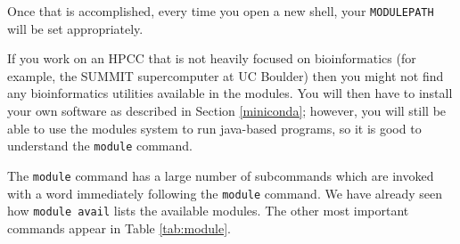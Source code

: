 \documentclass[]{krantz}
\makeatletter
\newenvironment{Shaded}{\begin{snugshade}}{\end{snugshade}}
\newcommand{\BuiltInTok}[1]{#1}
\newcommand{\NormalTok}[1]{#1}
\newcommand{\VariableTok}[1]{\textcolor[rgb]{0,0,0}{#1}}
\newenvironment{kframe}{%
\medskip{}
\setlength{\fboxsep}{.8em}
 \def\at@end@of@kframe{}%
 \ifinner\ifhmode%
  \def\at@end@of@kframe{\end{minipage}}%
  \begin{minipage}{\columnwidth}%
 \fi\fi%
 \def\FrameCommand##1{\hskip\@totalleftmargin \hskip-\fboxsep
 \colorbox{shadecolor}{##1}\hskip-\fboxsep
     \hskip-\linewidth \hskip-\@totalleftmargin \hskip\columnwidth}%
 \MakeFramed {\advance\hsize-\width
   \@totalleftmargin\z@ \linewidth\hsize
   \@setminipage}}%
 {\par\unskip\endMakeFramed%
 \at@end@of@kframe}
\renewenvironment{Shaded}{\begin{kframe}}{\end{kframe}}
\makeatother
\begin{document}
\begin{Shaded}
\end{Shaded}

Once that is accomplished, every time you open a new shell, your \texttt{MODULEPATH} will be
set appropriately.

If you work on an HPCC that is not heavily focused on bioinformatics (for example, the SUMMIT
supercomputer at UC Boulder) then you might not find any bioinformatics utilities available in
the modules. You will then have to install your own software as described in
Section \ref{miniconda}; however, you will still be able to use the modules system
to run java-based programs, so it is good to understand the \texttt{module} command.

The \texttt{module} command has a large number of subcommands which are invoked
with a word immediately following the \texttt{module} command. We have already seen
how \texttt{module\ avail} lists the available modules. The other most important commands
appear in Table \ref{tab:module}.
\end{document}
